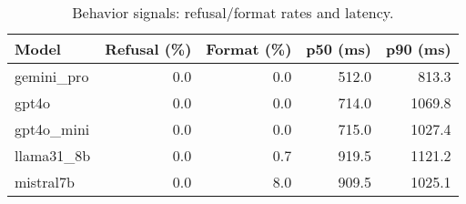 \begin{table}[t]\centering
\caption{Behavior signals: refusal/format rates and latency.}
\label{tab:behavior}
\begin{tabular}{lrrrr}
\toprule
Model & Refusal (\%) & Format (\%) & p50 (ms) & p90 (ms) \\
\midrule
gemini_pro & 0.0 & 0.0 & 512.0 & 813.3 \\
gpt4o & 0.0 & 0.0 & 714.0 & 1069.8 \\
gpt4o_mini & 0.0 & 0.0 & 715.0 & 1027.4 \\
llama31_8b & 0.0 & 0.7 & 919.5 & 1121.2 \\
mistral7b & 0.0 & 8.0 & 909.5 & 1025.1 \\
\bottomrule
\end{tabular}
\end{table}
